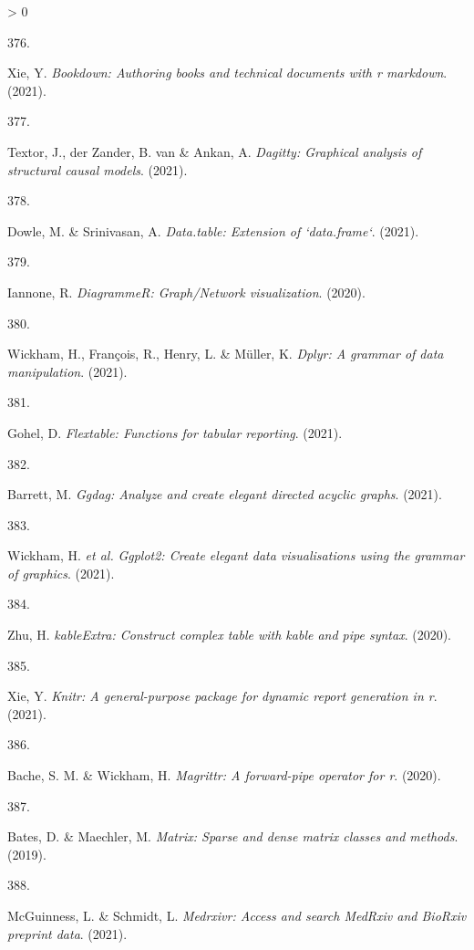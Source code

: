 \documentclass[a4paper, twoside]{templates/ociamthesis}
\newlength{\cslhangindent}
\newlength{\csllabelwidth}
\newenvironment{CSLReferences}[3] %
 {%
  \setlength{\parindent}{0pt}
  \ifodd #1 \everypar{\setlength{\hangindent}{\cslhangindent}}\ignorespaces\fi
  \ifnum #2 > 0
  \setlength{\parskip}{#2\baselineskip}
  \fi
 }%
 {}
\newcommand{\CSLLeftMargin}[1]{\parbox[t]{\maxof{\widthof{#1}}{\csllabelwidth}}{#1}}
\newcommand{\CSLRightInline}[1]{\parbox[t]{\linewidth - \csllabelwidth}{#1}}
\begin{document}
\begin{CSLReferences}{0}{0}
\leavevmode\hypertarget{ref-R-bookdown}{}%
\CSLLeftMargin{376. }
\CSLRightInline{Xie, Y. \emph{Bookdown: Authoring books and technical documents with r markdown}. (2021).}

\leavevmode\hypertarget{ref-R-dagitty}{}%
\CSLLeftMargin{377. }
\CSLRightInline{Textor, J., der Zander, B. van \& Ankan, A. \emph{Dagitty: Graphical analysis of structural causal models}. (2021).}

\leavevmode\hypertarget{ref-R-data.table}{}%
\CSLLeftMargin{378. }
\CSLRightInline{Dowle, M. \& Srinivasan, A. \emph{Data.table: Extension of `data.frame`}. (2021).}

\leavevmode\hypertarget{ref-R-DiagrammeR}{}%
\CSLLeftMargin{379. }
\CSLRightInline{Iannone, R. \emph{{DiagrammeR}: Graph/{Network} visualization}. (2020).}

\leavevmode\hypertarget{ref-R-dplyr}{}%
\CSLLeftMargin{380. }
\CSLRightInline{Wickham, H., François, R., Henry, L. \& Müller, K. \emph{Dplyr: A grammar of data manipulation}. (2021).}

\leavevmode\hypertarget{ref-R-flextable}{}%
\CSLLeftMargin{381. }
\CSLRightInline{Gohel, D. \emph{Flextable: Functions for tabular reporting}. (2021).}

\leavevmode\hypertarget{ref-R-ggdag}{}%
\CSLLeftMargin{382. }
\CSLRightInline{Barrett, M. \emph{Ggdag: Analyze and create elegant directed acyclic graphs}. (2021).}

\leavevmode\hypertarget{ref-R-ggplot2}{}%
\CSLLeftMargin{383. }
\CSLRightInline{Wickham, H. \emph{et al.} \emph{Ggplot2: Create elegant data visualisations using the grammar of graphics}. (2021).}

\leavevmode\hypertarget{ref-R-kableExtra}{}%
\CSLLeftMargin{384. }
\CSLRightInline{Zhu, H. \emph{{kableExtra}: Construct complex table with kable and pipe syntax}. (2020).}

\leavevmode\hypertarget{ref-R-knitr}{}%
\CSLLeftMargin{385. }
\CSLRightInline{Xie, Y. \emph{Knitr: A general-purpose package for dynamic report generation in r}. (2021).}

\leavevmode\hypertarget{ref-R-magrittr}{}%
\CSLLeftMargin{386. }
\CSLRightInline{Bache, S. M. \& Wickham, H. \emph{Magrittr: A forward-pipe operator for r}. (2020).}

\leavevmode\hypertarget{ref-R-Matrix}{}%
\CSLLeftMargin{387. }
\CSLRightInline{Bates, D. \& Maechler, M. \emph{Matrix: Sparse and dense matrix classes and methods}. (2019).}

\leavevmode\hypertarget{ref-R-medrxivr}{}%
\CSLLeftMargin{388. }
\CSLRightInline{McGuinness, L. \& Schmidt, L. \emph{Medrxivr: Access and search {MedRxiv} and {BioRxiv} preprint data}. (2021).}


\end{CSLReferences}
\end{document}
